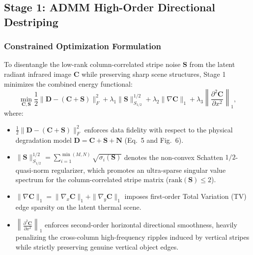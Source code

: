 
\subsection{Stage 1: ADMM High-Order Directional Destriping}
\label{subsec:stage1_admm}

\subsubsection{Constrained Optimization Formulation}
To disentangle the low-rank column-correlated stripe noise $\mathbf{S}$ from the latent radiant infrared image $\mathbf{C}$ while preserving sharp scene structures, Stage 1 minimizes the combined energy functional:
\begin{equation}
\label{eq:stage1_objective}
\min_{\mathbf{C}, \mathbf{S}} \frac{1}{2} \|\mathbf{D} - (\mathbf{C} + \mathbf{S})\|_F^2 + \lambda_1 \|\mathbf{S}\|_{S_{1/2}}^{1/2} + \lambda_2 \|\nabla \mathbf{C}\|_1 + \lambda_3 \left\| \frac{\partial^2 \mathbf{C}}{\partial x^2} \right\|_1,
\end{equation}
where:
\begin{itemize}
    \item $\frac{1}{2} \|\mathbf{D} - (\mathbf{C} + \mathbf{S})\|_F^2$ enforces data fidelity with respect to the physical degradation model $\mathbf{D} = \mathbf{C} + \mathbf{S} + \mathbf{N}$ (Eq.~5 and Fig.~6).
    \item $\|\mathbf{S}\|_{S_{1/2}}^{1/2} = \sum_{i=1}^{\min(M, N)} \sqrt{\sigma_i(\mathbf{S})}$ denotes the non-convex Schatten $1/2$-quasi-norm regularizer, which promotes an ultra-sparse singular value spectrum for the column-correlated stripe matrix ($\mathrm{rank}(\mathbf{S}) \le 2$).
    \item $\|\nabla \mathbf{C}\|_1 = \|\nabla_x \mathbf{C}\|_1 + \|\nabla_y \mathbf{C}\|_1$ imposes first-order Total Variation (TV) edge sparsity on the latent thermal scene.
    \item $\left\| \frac{\partial^2 \mathbf{C}}{\partial x^2} \right\|_1$ enforces second-order horizontal directional smoothness, heavily penalizing the cross-column high-frequency ripples induced by vertical stripes while strictly preserving genuine vertical object edges.
\end{itemize}

